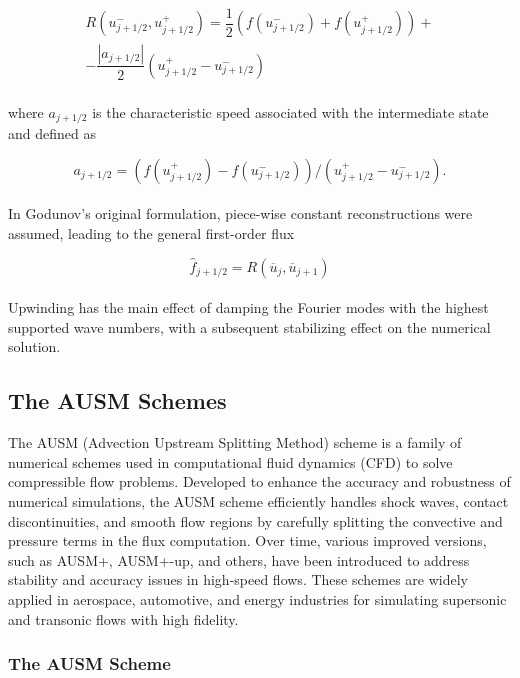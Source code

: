 \documentclass[a5paper]{sapthesis}
\begin{document}
	\begin{equation}
		\begin{aligned}
			\textit{R}(u_{j+1/2}^{-},u_{j+1/2}^{+}) = \dfrac{1}{2}(f(u_{j+1/2}^{-})+f(u_{j+1/2}^{+}))+\\
			-\dfrac{|a_{j+1/2}|}{2}(u_{j+1/2}^{+} - u_{j+1/2}^{-})
		\end{aligned}
	\end{equation}
	\\
	where $a_{j+1/2}$ is the characteristic speed associated with the intermediate state and defined as
	
	\begin{equation}
		a_{j+1/2}=(f(u_{j+1/2}^+)-f(u_{j+1/2}^-))/(u_{j+1/2}^{+}-u_{j+1/2}^{-}).
	\end{equation}
	\\
	In Godunov's original formulation, piece-wise constant reconstructions were assumed, leading to the general first-order flux
	
	\begin{equation}
		\hat{f}_{j+1/2} = \textit{R}(\overline{u}_{j},\overline{u}_{j+1})
	\end{equation}
	\\
	Upwinding has the main effect of damping the Fourier modes with the highest supported
	wave numbers, with a subsequent stabilizing effect on the numerical solution.
	
	\subsection{The AUSM Schemes}
	\label{AUSMsection}
	
	The AUSM (Advection Upstream Splitting Method) scheme is a family of numerical schemes used in computational fluid dynamics (CFD) to solve compressible flow problems. Developed to enhance the accuracy and robustness of numerical simulations, the AUSM scheme efficiently handles shock waves, contact discontinuities, and smooth flow regions by carefully splitting the convective and pressure terms in the flux computation. Over time, various improved versions, such as AUSM+, AUSM+-up, and others, have been introduced to address stability and accuracy issues in high-speed flows. These schemes are widely applied in aerospace, automotive, and energy industries for simulating supersonic and transonic flows with high fidelity.
	
	\subsubsection{The AUSM Scheme}
	
\end{document}
